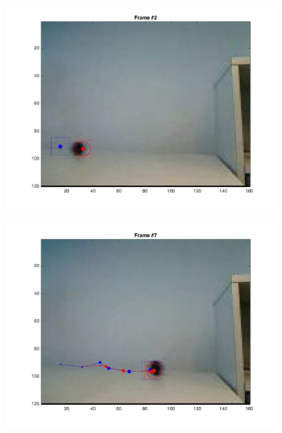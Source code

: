\documentclass{ethz_report}
\begin{document}
\begin{figure}[h]
    \centering
    \begin{subfigure}[b]{.25\textwidth}
        \centering
        \includegraphics[width=1\linewidth]{images/video3_particles_low_1}
    \end{subfigure}%
    \begin{subfigure}[b]{.25\textwidth}
        \centering
        \includegraphics[width=1\linewidth]{images/video3_particles_low_6}
    \end{subfigure}%
    \begin{subfigure}[b]{.25\textwidth}
        \centering

\end{subfigure}
\end{figure}
\end{document}
